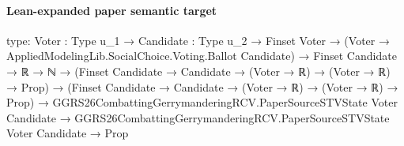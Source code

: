 \documentclass[10pt]{article}
\begin{document}
\paragraph{Lean-expanded paper semantic target}
\begin{ReviewVerbatim}
type:
{Voter : Type u_1} →
  {Candidate : Type u_2} →
    Finset Voter →
      (Voter → AppliedModelingLib.SocialChoice.Voting.Ballot Candidate) →
        Finset Candidate →
          ℝ →
            ℕ →
              (Finset Candidate → Candidate → (Voter → ℝ) → (Voter → ℝ) → Prop) →
                (Finset Candidate → Candidate → (Voter → ℝ) → (Voter → ℝ) → Prop) →
                  GGRS26CombattingGerrymanderingRCV.PaperSourceSTVState Voter Candidate →
                    GGRS26CombattingGerrymanderingRCV.PaperSourceSTVState Voter Candidate → Prop


\end{ReviewVerbatim}
\end{document}
